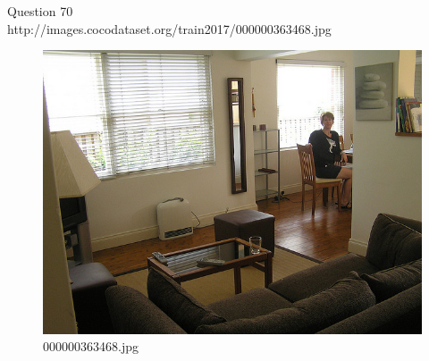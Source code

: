 Question 70\\
http://images.cocodataset.org/train2017/000000363468.jpg
\begin{figure}[h]
    \centering
    \includegraphics[width=0.8\linewidth]{../image set/hard/000000363468.jpg}
    \caption{000000363468.jpg}
\end{figure}
